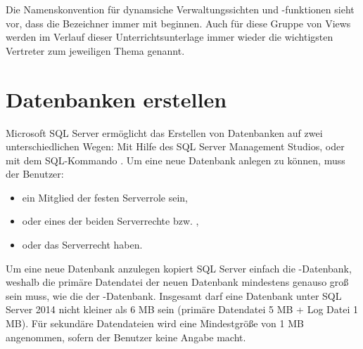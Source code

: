         Die Namenskonvention für dynamsiche Verwaltungssichten und -funktionen
        sieht vor, dass die Bezeichner immer mit 
        beginnen. Auch für diese Gruppe von Views werden im Verlauf dieser
        Unterrichtsunterlage immer wieder die wichtigsten Vertreter zum
        jeweiligen Thema genannt.
        
        \begin{literaturinternet}
          \item \cite{ms188754}
        \end{literaturinternet}
    \section{Datenbanken erstellen}
      Microsoft SQL Server ermöglicht das Erstellen von Datenbanken auf zwei
      unterschiedlichen Wegen: Mit Hilfe des SQL Server Management Studios,
      oder mit dem SQL-Kommando . Um eine neue
      Datenbank anlegen zu können, muss der Benutzer:
      \begin{itemize}
        \item ein Mitglied der festen Serverrole  sein,
        \item oder eines der beiden Serverrechte  bzw.
        ,
        \item oder das Serverrecht  haben. 
      \end{itemize}
      Um eine neue Datenbank anzulegen kopiert SQL Server einfach die
      -Datenbank, weshalb die primäre Datendatei der neuen
      Datenbank mindestens genauso groß sein muss, wie die der
      -Datenbank. Insgesamt darf eine Datenbank unter SQL
      Server 2014 nicht kleiner als 6 MB sein (primäre Datendatei 5 MB + Log
      Datei 1 MB). Für sekundäre Datendateien wird eine Mindestgröße von 1 MB
      angenommen, sofern der Benutzer keine Angabe macht.
